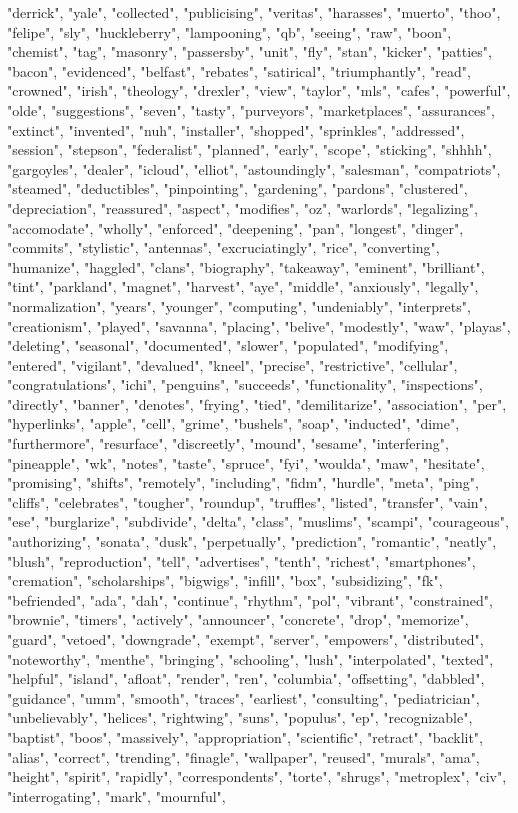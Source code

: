 "derrick", "yale", "collected", "publicising", "veritas", "harasses", "muerto", "thoo", "felipe", "sly", "huckleberry", "lampooning", "qb", "seeing", "raw", "boon", "chemist", "tag", "masonry", "passersby", "unit", "fly", "stan", "kicker", "patties", "bacon", "evidenced", "belfast", "rebates", "satirical", "triumphantly", "read", "crowned", "irish", "theology", "drexler", "view", "taylor", "mls", "cafes", "powerful", "olde", "suggestions", "seven", "tasty", "purveyors", "marketplaces", "assurances", "extinct", "invented", "nuh", "installer", "shopped", "sprinkles", "addressed", "session", "stepson", "federalist", "planned", "early", "scope", "sticking", "shhhh", "gargoyles", "dealer", "icloud", "elliot", "astoundingly", "salesman", "compatriots", "steamed", "deductibles", "pinpointing", "gardening", "pardons", "clustered", "depreciation", "reassured", "aspect", "modifies", "oz", "warlords", "legalizing", "accomodate", "wholly", "enforced", "deepening", "pan", "longest", "dinger", "commits", "stylistic", "antennas", "excruciatingly", "rice", "converting", "humanize", "haggled", "clans", "biography", "takeaway", "eminent", "brilliant", "tint", "parkland", "magnet", "harvest", "aye", "middle", "anxiously", "legally", "normalization", "years", "younger", "computing", "undeniably", "interprets", "creationism", "played", "savanna", "placing", "belive", "modestly", "waw", "playas", "deleting", "seasonal", "documented", "slower", "populated", "modifying", "entered", "vigilant", "devalued", "kneel", "precise", "restrictive", "cellular", "congratulations", "ichi", "penguins", "succeeds", "functionality", "inspections", "directly", "banner", "denotes", "frying", "tied", "demilitarize", "association", "per", "hyperlinks", "apple", "cell", "grime", "bushels", "soap", "inducted", "dime", "furthermore", "resurface", "discreetly", "mound", "sesame", "interfering", "pineapple", "wk", "notes", "taste", "spruce", "fyi", "woulda", "maw", "hesitate", "promising", "shifts", "remotely", "including", "fidm", "hurdle", "meta", "ping", "cliffs", "celebrates", "tougher", "roundup", "truffles", "listed", "transfer", "vain", "ese", "burglarize", "subdivide", "delta", "class", "muslims", "scampi", "courageous", "authorizing", "sonata", "dusk", "perpetually", "prediction", "romantic", "neatly", "blush", "reproduction", "tell", "advertises", "tenth", "richest", "smartphones", "cremation", "scholarships", "bigwigs", "infill", "box", "subsidizing", "fk", "befriended", "ada", "dah", "continue", "rhythm", "pol", "vibrant", "constrained", "brownie", "timers", "actively", "announcer", "concrete", "drop", "memorize", "guard", "vetoed", "downgrade", "exempt", "server", "empowers", "distributed", "noteworthy", "menthe", "bringing", "schooling", "lush", "interpolated", "texted", "helpful", "island", "afloat", "render", "ren", "columbia", "offsetting", "dabbled", "guidance", "umm", "smooth", "traces", "earliest", "consulting", "pediatrician", "unbelievably", "helices", "rightwing", "suns", "populus", "ep", "recognizable", "baptist", "boos", "massively", "appropriation", "scientific", "retract", "backlit", "alias", "correct", "trending", "finagle", "wallpaper", "reused", "murals", "ama", "height", "spirit", "rapidly", "correspondents", "torte", "shrugs", "metroplex", "civ", "interrogating", "mark", "mournful", 